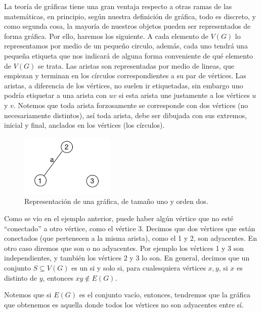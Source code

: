     
La teoría de gráficas tiene una gran ventaja respecto a otras ramas de las matemáticas, en principio, según nuestra definición de gráfica, todo es discreto, y como segunda cosa, la mayoría de nuestros objetos pueden ser representados de forma gráfica.
Por ello, haremos los siguiente.  A cada elemento de $V(G)$ lo representamos por medio de un pequeño circulo, adem\'as, cada uno tendrá una pequeña etiqueta que nos indicará de alguna forma conveniente de qué elemento de $V(G)$ se trata. Las aristas son representadas por medio de lineas, que empiezan y terminan en los círculos correspondientes a su par de vértices. Las aristas, a diferencia de los vértices, no suelen ir etiquetadas, sin embargo uno podría etiquetar a una arista con $uv$ si esta arista une justamente a los vértices $u$ y $v$.
Notemos que toda arista forzosamente se corresponde con dos vértices (no necesariamente distintos), así toda arista, debe ser dibujada con sus extremos, inicial y final, anclados en los vértices (los círculos).

\begin{figure}[H]
  \centering
  \includegraphics[width=0.4\textwidth]{recursos/capturas/01(1).jpg}
  \caption{Representación de una gráfica, de tamaño uno y orden dos.}
  \label{fig:01}
\end{figure}

Como se vio en el ejemplo anterior, puede haber algún vértice que no esté ``conectado'' a otro vértice, como el vértice 3.
Decimos que dos vértices que est\'an conectados (que pertenecen a la misma arista), como el 1 y 2, son adyacentes. 
En otro caso diremos que son  o no adyacentes. Por ejemplo los v\'ertices 1 y 3 son independientes, y tambi\'en los v\'ertices 2 y 3 lo son.
En general, decimos que un conjunto $S\subseteq V(G)$ es  un  si y solo si, para cualesquiera v\' ertices $x,y$, si $x$ es distinto de $y$, entonces $xy\notin E(G)$.

Notemos que si $E(G)$ es el conjunto vacío, entonces, tendremos que la gráfica que obtenemos es aquella donde todos los vértices no son adyacentes entre sí.

